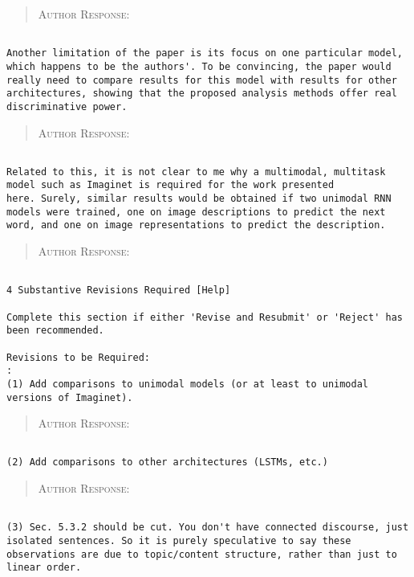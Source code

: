 \begin{quote}
\textsc{Author Response:}  
\end{quote}
\begin{verbatim}

Another limitation of the paper is its focus on one particular model,
which happens to be the authors'. To be convincing, the paper would
really need to compare results for this model with results for other
architectures, showing that the proposed analysis methods offer real
discriminative power.
\end{verbatim}  
\begin{quote}
\textsc{Author Response:}  
\end{quote}
\begin{verbatim}

Related to this, it is not clear to me why a multimodal, multitask
model such as Imaginet is required for the work presented
here. Surely, similar results would be obtained if two unimodal RNN
models were trained, one on image descriptions to predict the next
word, and one on image representations to predict the description.
\end{verbatim}  
\begin{quote}
\textsc{Author Response:}  
\end{quote}
\begin{verbatim}

4 Substantive Revisions Required [Help]

Complete this section if either 'Revise and Resubmit' or 'Reject' has
been recommended.

Revisions to be Required:
: 
(1) Add comparisons to unimodal models (or at least to unimodal
versions of Imaginet).
\end{verbatim}  
\begin{quote}
\textsc{Author Response:}  
\end{quote}
\begin{verbatim}

(2) Add comparisons to other architectures (LSTMs, etc.)
\end{verbatim}  
\begin{quote}
\textsc{Author Response:}  
\end{quote}
\begin{verbatim}

(3) Sec. 5.3.2 should be cut. You don't have connected discourse, just
isolated sentences. So it is purely speculative to say these
observations are due to topic/content structure, rather than just to
linear order.
\end{verbatim}  
